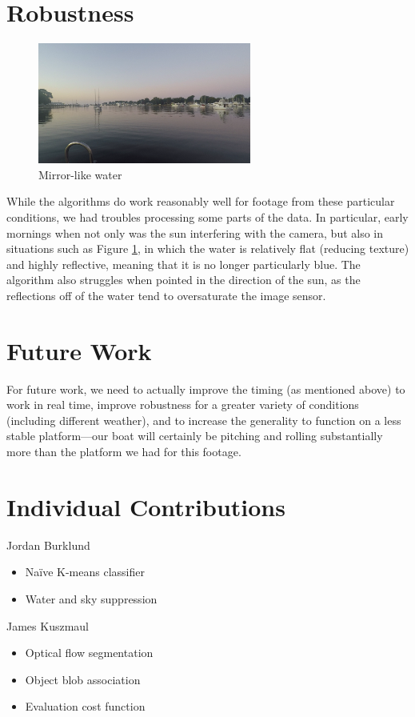 \documentclass[conference]{IEEEtran}
\begin{document}
\section{Robustness}

\begin{figure}[H]
\includegraphics[width=7cm]{sample1}
\centering
\caption{Mirror-like water}
\label{fig:mirror}
\end{figure}

While the algorithms do work reasonably well for footage from these particular
conditions, we had troubles processing some parts of the data. In particular,
early mornings when not only was the sun interfering with the camera,
but also in situations such as Figure \ref{fig:mirror}, in which the water is
relatively flat (reducing texture) and highly reflective, meaning that it is no
longer particularly blue. The algorithm also struggles when pointed in the
 direction of the sun, as the reflections off of the water tend to oversaturate the image sensor.


\section{Future Work}

For future work, we need to actually improve the timing (as mentioned above) to
work in real time, improve robustness for a greater variety of conditions
(including different weather), and
to increase the generality to function on a less stable platform---our boat will
certainly be pitching and rolling substantially more than the platform we had
for this footage.

\section{Individual Contributions}
Jordan Burklund
\begin{itemize}

\item Na\"ive K-means classifier
\item Water and sky suppression
\end{itemize}

James Kuszmaul
\begin{itemize}
\item Optical flow segmentation
\item Object blob association
\item Evaluation cost function
\end{itemize}
\end{document}
